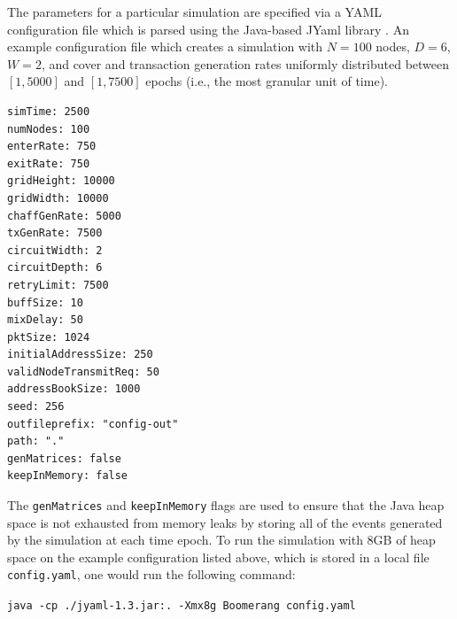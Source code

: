 The parameters for a particular simulation are specified via a YAML configuration file which is parsed using the Java-based JYaml library \cite{jyaml}. An example configuration file which creates a simulation with $N = 100$ nodes, $D = 6$, $W = 2$, and cover and transaction generation rates uniformly distributed between $[1, 5000]$ and $[1, 7500]$ epochs (i.e., the most granular unit of time).

\begin{lstlisting}
simTime: 2500
numNodes: 100
enterRate: 750
exitRate: 750
gridHeight: 10000
gridWidth: 10000
chaffGenRate: 5000
txGenRate: 7500
circuitWidth: 2
circuitDepth: 6
retryLimit: 7500
buffSize: 10
mixDelay: 50
pktSize: 1024
initialAddressSize: 250
validNodeTransmitReq: 50
addressBookSize: 1000
seed: 256
outfileprefix: "config-out"
path: "."
genMatrices: false
keepInMemory: false
\end{lstlisting}

The {\tt genMatrices} and {\tt keepInMemory} flags are used to ensure that the Java heap space is not exhausted from memory leaks by storing all of the events generated by the simulation at each time epoch. To run the simulation with 8GB of heap space on the example configuration listed above, which is stored in a local file {\tt config.yaml}, one would run the following command:

\begin{center}
{\small \tt java -cp ./jyaml-1.3.jar:. -Xmx8g Boomerang config.yaml}
\end{center}

